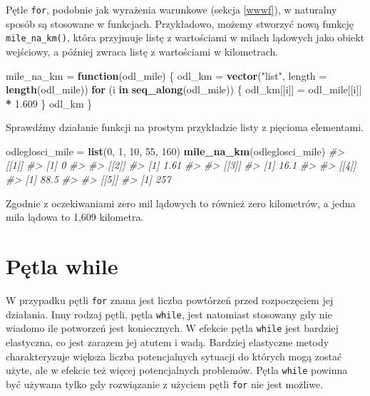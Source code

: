 \documentclass[paper=6in:9in,pagesize=pdftex,headinclude=on,footinclude=on,10pt]{scrbook}
\newenvironment{Shaded}{\begin{snugshade}}{\end{snugshade}}
\newcommand{\CommentTok}[1]{\textcolor[rgb]{0.56,0.35,0.01}{\textit{#1}}}
\newcommand{\ControlFlowTok}[1]{\textcolor[rgb]{0.13,0.29,0.53}{\textbf{#1}}}
\newcommand{\DataTypeTok}[1]{\textcolor[rgb]{0.13,0.29,0.53}{#1}}
\newcommand{\DecValTok}[1]{\textcolor[rgb]{0.00,0.00,0.81}{#1}}
\newcommand{\FloatTok}[1]{\textcolor[rgb]{0.00,0.00,0.81}{#1}}
\newcommand{\KeywordTok}[1]{\textcolor[rgb]{0.13,0.29,0.53}{\textbf{#1}}}
\newcommand{\NormalTok}[1]{#1}
\newcommand{\OperatorTok}[1]{\textcolor[rgb]{0.81,0.36,0.00}{\textbf{#1}}}
\newcommand{\StringTok}[1]{\textcolor[rgb]{0.31,0.60,0.02}{#1}}
\begin{document}
Pętle \texttt{for}, podobnie jak wyrażenia warunkowe (sekcja \ref{wwwf}), w naturalny sposób są stosowane w funkcjach.
Przykładowo, możemy stworzyć nową funkcję \texttt{mile\_na\_km()}, która przyjmuje listę z wartościami w milach lądowych jako obiekt wejściowy, a później zwraca listę z wartościami w kilometrach.

\begin{Shaded}
\begin{Highlighting}[]
\NormalTok{mile_na_km =}\StringTok{ }\ControlFlowTok{function}\NormalTok{(odl_mile) \{}
\NormalTok{  odl_km =}\StringTok{ }\KeywordTok{vector}\NormalTok{(}\StringTok{"list"}\NormalTok{, }\DataTypeTok{length =} \KeywordTok{length}\NormalTok{(odl_mile))}
  \ControlFlowTok{for}\NormalTok{ (i }\ControlFlowTok{in} \KeywordTok{seq_along}\NormalTok{(odl_mile)) \{}
\NormalTok{    odl_km[[i]] =}\StringTok{ }\NormalTok{odl_mile[[i]] }\OperatorTok{*}\StringTok{ }\FloatTok{1.609}
\NormalTok{  \}}
\NormalTok{  odl_km}
\NormalTok{\}}
\end{Highlighting}
\end{Shaded}

Sprawdźmy działanie funkcji na prostym przykładzie listy z pięcioma elementami.

\begin{Shaded}
\begin{Highlighting}[]
\NormalTok{odleglosci_mile =}\StringTok{ }\KeywordTok{list}\NormalTok{(}\DecValTok{0}\NormalTok{, }\DecValTok{1}\NormalTok{, }\DecValTok{10}\NormalTok{, }\DecValTok{55}\NormalTok{, }\DecValTok{160}\NormalTok{)}
\KeywordTok{mile_na_km}\NormalTok{(odleglosci_mile)}
\CommentTok{#> [[1]]}
\CommentTok{#> [1] 0}
\CommentTok{#> }
\CommentTok{#> [[2]]}
\CommentTok{#> [1] 1.61}
\CommentTok{#> }
\CommentTok{#> [[3]]}
\CommentTok{#> [1] 16.1}
\CommentTok{#> }
\CommentTok{#> [[4]]}
\CommentTok{#> [1] 88.5}
\CommentTok{#> }
\CommentTok{#> [[5]]}
\CommentTok{#> [1] 257}
\end{Highlighting}
\end{Shaded}

Zgodnie z oczekiwaniami zero mil lądowych to również zero kilometrów, a jedna mila lądowa to 1,609 kilometra.

\hypertarget{petla-while}{%
\section{Pętla while}\label{petla-while}}

W przypadku pętli \texttt{for} znana jest liczba powtórzeń przed rozpoczęciem jej działania.
Inny rodzaj pętli, pętla \texttt{while}, jest natomiast stosowany gdy nie wiadomo ile potworzeń jest koniecznych.
W efekcie pętla \texttt{while} jest bardziej elastyczna, co jest zarazem jej atutem i wadą.
Bardziej elastyczne metody charakteryzuje większa liczba potencjalnych sytuacji do których mogą zostać użyte, ale w efekcie też więcej potencjalnych problemów.
Pętla \texttt{while} powinna być używana tylko gdy rozwiązanie z użyciem pętli \texttt{for} nie jest możliwe.
\end{document}
